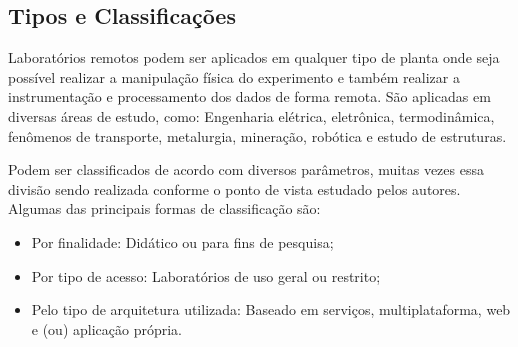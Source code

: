 \subsection{Tipos e Classificações}

Laboratórios remotos podem ser aplicados em qualquer tipo de planta onde seja possível realizar a manipulação física do experimento e também realizar a instrumentação e processamento dos dados de forma remota. São aplicadas em diversas áreas de estudo, como: Engenharia elétrica, eletrônica, termodinâmica, fenômenos de transporte, metalurgia, mineração, robótica e estudo de estruturas. \cite{argyropoulos1983facility} \cite{sanchez2004java} \cite{andria2006remote} 
\par
Podem ser classificados de acordo com diversos parâmetros, muitas vezes essa divisão sendo realizada conforme o ponto de vista estudado pelos autores. Algumas das principais formas de classificação são:
\begin{itemize}
    \item Por finalidade: Didático ou para fins de pesquisa;
    \item Por tipo de acesso: Laboratórios de uso geral ou restrito;
    \item Pelo tipo de arquitetura utilizada: Baseado em serviços, multiplataforma, web e (ou) aplicação própria.
\end{itemize}
